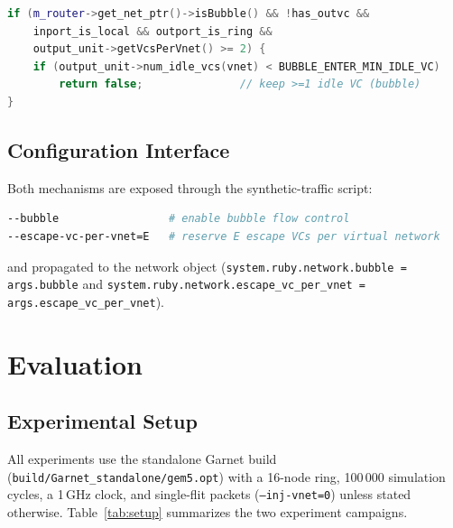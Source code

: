 \documentclass[11pt,a4paper]{article}
\begin{document}
\begin{lstlisting}[style=cppstyle, language=C++]
if (m_router->get_net_ptr()->isBubble() && !has_outvc &&
    inport_is_local && outport_is_ring &&
    output_unit->getVcsPerVnet() >= 2) {
    if (output_unit->num_idle_vcs(vnet) < BUBBLE_ENTER_MIN_IDLE_VC)
        return false;               // keep >=1 idle VC (bubble)
}
\end{lstlisting}

\subsection{Configuration Interface}
Both mechanisms are exposed through the synthetic-traffic script:

\begin{lstlisting}[style=cppstyle, language=bash]
--bubble                 # enable bubble flow control
--escape-vc-per-vnet=E   # reserve E escape VCs per virtual network
\end{lstlisting}

and propagated to the network object
(\texttt{system.ruby.network.bubble = args.bubble} and
\texttt{system.ruby.network.escape\_vc\_per\_vnet = args.escape\_vc\_per\_vnet}).

\section{Evaluation}
\label{sec:eval}

\subsection{Experimental Setup}
\label{sec:eval:setup}
All experiments use the standalone Garnet build
(\texttt{build/Garnet\_standalone/gem5.opt}) with a 16-node ring, 100\,000
simulation cycles, a 1\,GHz clock, and single-flit packets
(\texttt{--inj-vnet=0}) unless stated otherwise.  Table~\ref{tab:setup}
summarizes the two experiment campaigns.
\end{document}
